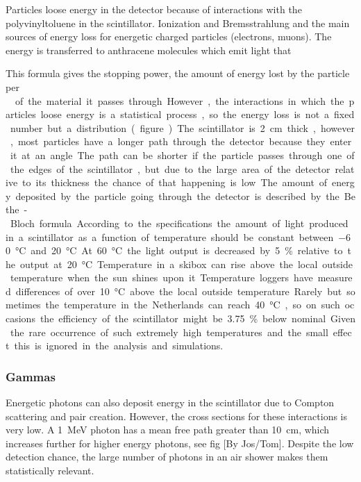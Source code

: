 Particles loose energy in the detector because of interactions with the polyvinyltoluene in the scintillator. Ionization and Bremsstrahlung and the main sources of energy loss for energetic charged particles (electrons, muons). The energy is transferred to anthracene molecules which emit light that

This formula gives the stopping power, the amount of energy lost by the particle per \SI{}{\gram\centi\meter\square} of the material it passes through. However, the interactions in which the particles loose energy is a statistical process, so the energy loss is not a fixed number but a distribution. (figure...)

The scintillator is \SI{2}{\centi\meter} thick, however, most particles have a longer path through the detector because they enter it at an angle. The path can be shorter if the particle passes through one of the edges of the scintillator, but due to the large area of the detector relative to its thickness the chance of that happening is low. The amount of energy deposited by the particle going through the detector is described by the Bethe-Bloch formula.

According to the specifications the amount of light produced in a scintillator as a function of temperature should be constant between \SI{-60}{\degreeCelsius} and \SI{20}{\degreeCelsius}. At \SI{60}{\degreeCelsius} the light output is decreased by \SI{5}{\percent} relative to the output at \SI{20}{\degreeCelsius}. Temperature in a skibox can rise above the local outside temperature when the sun shines upon it. Temperature loggers have measured differences of over \SI{10}{\degreeCelsius} above the local outside temperature. Rarely but sometimes the temperature in the Netherlands can reach \SI{40}{\degreeCelsius}, so on such occasions the efficiency of the scintillator might be \SI{3.75}{\percent} below nominal. Given the rare occurrence of such extremely high temperatures and the small effect this is ignored in the analysis and simulations.


\subsubsection{Gammas}


Energetic photons can also deposit energy in the scintillator due to Compton scattering and pair creation. However, the cross sections for these interactions is very low. A \SI{1}{\MeV} photon  has a mean free path greater than \SI{10}{\centi\meter}, which increases further for higher energy photons, see fig [By Jos/Tom]. Despite the low detection chance, the large number of photons in an air shower makes them statistically relevant.



